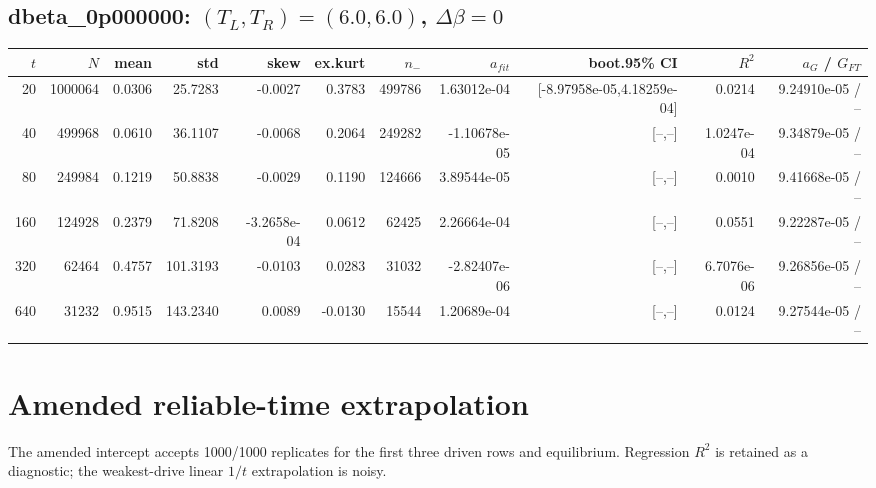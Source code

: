 \documentclass[10pt]{article}
\begin{document}
\subsection*{dbeta\_0p000000: $(T_L,T_R)=(6.0,6.0)$, $\Delta\beta=0$}
\scriptsize\begin{longtable}{rrrrrrrrrrr}
\toprule $t$ & $N$ & mean & std & skew & ex.kurt & $n_-$ & $a_{fit}$ & boot.95\% CI & $R^2$ & $a_G$ / $G_{FT}$ \\
\midrule\endhead
20 & 1000064 & 0.0306 & 25.7283 & -0.0027 & 0.3783 & 499786 & 1.63012e-04 & [-8.97958e-05,4.18259e-04] & 0.0214 & 9.24910e-05 / -- \\
40 & 499968 & 0.0610 & 36.1107 & -0.0068 & 0.2064 & 249282 & -1.10678e-05 & [--,--] & 1.0247e-04 & 9.34879e-05 / -- \\
80 & 249984 & 0.1219 & 50.8838 & -0.0029 & 0.1190 & 124666 & 3.89544e-05 & [--,--] & 0.0010 & 9.41668e-05 / -- \\
160 & 124928 & 0.2379 & 71.8208 & -3.2658e-04 & 0.0612 & 62425 & 2.26664e-04 & [--,--] & 0.0551 & 9.22287e-05 / -- \\
320 & 62464 & 0.4757 & 101.3193 & -0.0103 & 0.0283 & 31032 & -2.82407e-06 & [--,--] & 6.7076e-06 & 9.26856e-05 / -- \\
640 & 31232 & 0.9515 & 143.2340 & 0.0089 & -0.0130 & 15544 & 1.20689e-04 & [--,--] & 0.0124 & 9.27544e-05 / -- \\
\bottomrule\end{longtable}\normalsize
\section*{Amended reliable-time extrapolation}
\begin{center}\end{center}
The amended intercept accepts 1000/1000 replicates for the first three driven rows and equilibrium.  Regression $R^2$ is retained as a diagnostic; the weakest-drive linear $1/t$ extrapolation is noisy.
\end{document}
